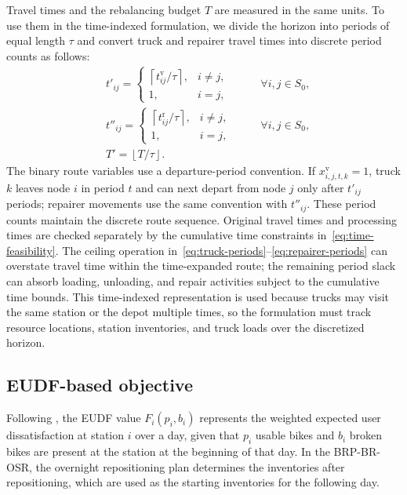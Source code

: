 Travel times and the rebalancing budget $T$ are measured in the same units.
To use them in the time-indexed formulation, we divide the horizon into periods
of equal length $\tau$ and convert truck and repairer travel times into discrete
period counts as follows:
\begin{align}
&t'_{ij} =
\begin{cases}
\left\lceil t_{ij}^{\mathrm{v}}/\tau \right\rceil, & i\ne j,\\
1, & i=j,
\end{cases}
\quad &&\forall i,j\in S_0, \label{eq:truck-periods}\\
&t''_{ij} =
\begin{cases}
\left\lceil t_{ij}^{\mathrm{r}}/\tau \right\rceil, & i\ne j,\\
1, & i=j,
\end{cases}
\quad &&\forall i,j\in S_0, \label{eq:repairer-periods}\\
&T' = \left\lfloor T/\tau \right\rfloor. && \label{eq:num-periods}
\end{align}
The binary route variables use a departure-period convention. If
$x_{i,j,t,k}^{\mathrm{v}}=1$, truck $k$ leaves node $i$ in period $t$ and can
next depart from node $j$ only after $t'_{ij}$ periods; repairer movements use
the same convention with $t''_{ij}$. These period counts maintain the discrete
route sequence. Original travel times and processing times are checked
separately by the cumulative time constraints in~\eqref{eq:time-feasibility}.
The ceiling operation in~\eqref{eq:truck-periods}--\eqref{eq:repairer-periods}
can overstate travel time within the time-expanded route; the remaining period
slack can absorb loading, unloading, and repair activities subject to the
cumulative time bounds. This time-indexed representation is used because trucks
may visit the same station or the depot multiple times, so the formulation must
track resource locations, station inventories, and truck loads over the
discretized horizon.

\subsection{EUDF-based objective}\label{sec:bivariate-udf}

Following \citet{kaspiBikesharingSystemsUser2017}, the EUDF value
$F_i(p_i,b_i)$ represents the weighted expected user dissatisfaction at station
$i$ over a day, given that $p_i$ usable bikes and $b_i$ broken bikes are present
at the station at the beginning of that day. In the BRP-BR-OSR, the overnight
repositioning plan determines the inventories after repositioning, which are used
as the starting inventories for the following day.

